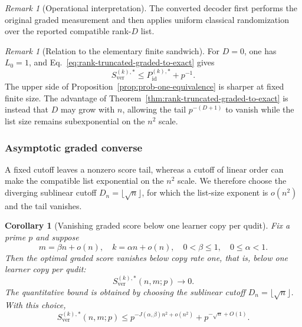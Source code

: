\documentclass[11pt]{article}
\newcommand{\1}{\mathbf 1}
\theoremstyle{plain}
\newtheorem{corollary}[theorem]{Corollary}
\theoremstyle{definition}
\theoremstyle{remark}
\newtheorem{remark}[theorem]{Remark}
\begin{document}
\begin{remark}[Operational interpretation]  
The converted decoder first performs the original graded measurement and then  
applies uniform classical randomization over the reported compatible  
rank-$D$ list.  
\end{remark}

\begin{remark}[Relation to the elementary finite sandwich]
For $D=0$, one has $L_0=1$, and
Eq.~\eqref{eq:rank-truncated-graded-to-exact} gives
\[
 S_{\mathrm{ver}}^{(k),*}
 \le P_{\mathrm{id}}^{(k),*}+p^{-1}.
\]
The upper side of
Proposition~\ref{prop:prob-one-equivalence} is sharper at fixed
finite size.  The advantage of
Theorem~\ref{thm:rank-truncated-graded-to-exact} is instead that $D$ may grow
with $n$, allowing the tail $p^{-(D+1)}$ to vanish while the list size remains
subexponential on the $n^2$ scale.
\end{remark}

\subsubsection{Asymptotic graded converse}
\label{subsec:graded-asymptotic-converse}

A fixed cutoff leaves a nonzero score tail, whereas a cutoff of linear order  
can make the compatible list exponential on the $n^2$ scale.  We therefore  
choose the diverging sublinear cutoff $D_n=\lfloor\sqrt n\rfloor$, for which the  
list-size exponent is $o(n^2)$ and the tail vanishes.  

\begin{corollary}[Vanishing graded score below one learner copy per qudit]
\label{cor:graded-score-to-zero}
Fix a prime $p$ and suppose
\[
 m=\beta n+o(n),\quad k=\alpha n+o(n),
 \quad 0<\beta\le1,\quad 0\le\alpha<1.
\]
Then the optimal graded score vanishes below copy rate one, that is, below one learner copy per qudit:
\begin{equation}
 S_{\mathrm{ver}}^{(k),*}(n,m;p)\longrightarrow0.
 \label{eq:graded-score-to-zero}
\end{equation}
The quantitative bound is obtained by choosing the sublinear cutoff
$D_n=\lfloor\sqrt n\rfloor$.  With this choice,
\begin{equation}
 S_{\mathrm{ver}}^{(k),*}(n,m;p)
 \le
 p^{-J(\alpha,\beta)n^2+o(n^2)}
 +p^{-\sqrt n+O(1)}.
 \label{eq:graded-score-stretched-exponential}
\end{equation}
\end{corollary}
\end{document}
